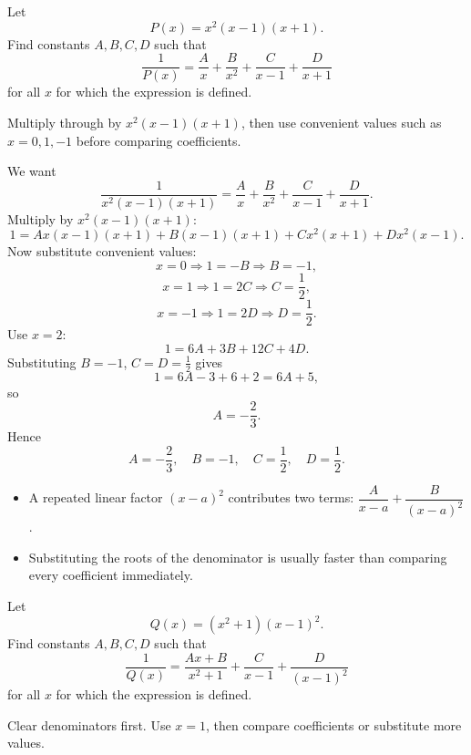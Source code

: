 \begin{problem}
Let
\[
P(x)=x^2(x-1)(x+1).
\]
Find constants $A,B,C,D$ such that
\[
\frac{1}{P(x)}=\frac{A}{x}+\frac{B}{x^2}+\frac{C}{x-1}+\frac{D}{x+1}
\]
for all $x$ for which the expression is defined.
\end{problem}

\begin{hintbox}
Multiply through by $x^2(x-1)(x+1)$, then use convenient values such as $x=0,1,-1$ before comparing coefficients.
\end{hintbox}

\begin{solution}
We want
\[
\frac{1}{x^2(x-1)(x+1)}=\frac{A}{x}+\frac{B}{x^2}+\frac{C}{x-1}+\frac{D}{x+1}.
\]
Multiply by $x^2(x-1)(x+1)$:
\[
1=Ax(x-1)(x+1)+B(x-1)(x+1)+Cx^2(x+1)+Dx^2(x-1).
\]
Now substitute convenient values:
\[
x=0 \Rightarrow 1=-B \Rightarrow B=-1,
\]
\[
x=1 \Rightarrow 1=2C \Rightarrow C=\frac12,
\]
\[
x=-1 \Rightarrow 1=2D \Rightarrow D=\frac12.
\]
Use $x=2$:
\[
1=6A+3B+12C+4D.
\]
Substituting $B=-1$, $C=D=\frac12$ gives
\[
1=6A-3+6+2=6A+5,
\]
so
\[
A=-\frac23.
\]
Hence
\[
\boxed{A=-\frac23,\quad B=-1,\quad C=\frac12,\quad D=\frac12.}
\]
\end{solution}

\begin{takeaways}
\begin{itemize}[leftmargin=*]
\item A repeated linear factor $(x-a)^2$ contributes two terms: $\dfrac{A}{x-a}+\dfrac{B}{(x-a)^2}$.
\item Substituting the roots of the denominator is usually faster than comparing every coefficient immediately.
\end{itemize}
\end{takeaways}

\begin{problem}
Let
\[
Q(x)=(x^2+1)(x-1)^2.
\]
Find constants $A,B,C,D$ such that
\[
\frac{1}{Q(x)}=\frac{Ax+B}{x^2+1}+\frac{C}{x-1}+\frac{D}{(x-1)^2}
\]
for all $x$ for which the expression is defined.
\end{problem}

\begin{hintbox}
Clear denominators first. Use $x=1$, then compare coefficients or substitute more values.
\end{hintbox}

